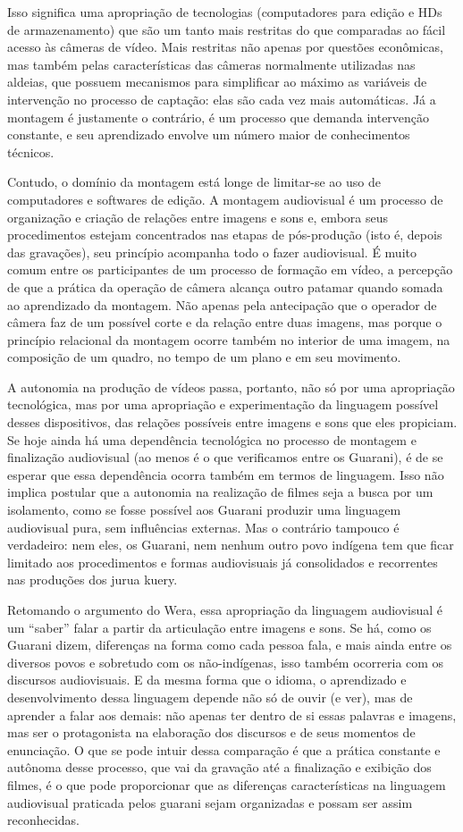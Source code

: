 Isso significa uma apropriação de tecnologias (computadores para edição
e HDs de armazenamento) que são um tanto mais restritas do que
comparadas ao fácil acesso às câmeras de vídeo. Mais restritas não
apenas por questões econômicas, mas também pelas características das
câmeras normalmente utilizadas nas aldeias, que possuem mecanismos para
simplificar ao máximo as variáveis de intervenção no processo de
captação: elas são cada vez mais automáticas. Já a montagem é
justamente o contrário, é um processo que demanda intervenção
constante, e seu aprendizado envolve um número maior de conhecimentos
técnicos.

Contudo, o domínio da montagem está longe de limitar-se ao uso de
computadores e softwares de edição. A montagem audiovisual é um
processo de organização e criação de relações entre imagens e sons e,
embora seus procedimentos estejam concentrados nas etapas de
pós-produção (isto é, depois das gravações), seu princípio acompanha
todo o fazer audiovisual. É muito comum entre os participantes de um
processo de formação em vídeo, a percepção de que a prática da operação
de câmera alcança outro patamar quando somada ao aprendizado da
montagem. Não apenas pela antecipação que o operador de câmera faz de
um possível corte e da relação entre duas imagens, mas porque o
princípio relacional da montagem ocorre também no interior de uma
imagem, na composição de um quadro, no tempo de um plano e em seu
movimento.

A autonomia na produção de vídeos passa, portanto, não só por uma
apropriação tecnológica, mas por uma apropriação e experimentação da
linguagem possível desses dispositivos, das relações possíveis entre
imagens e sons que eles propiciam. Se hoje ainda há uma dependência
tecnológica no processo de montagem e finalização audiovisual (ao menos
é o que verificamos entre os Guarani), é de se esperar que essa
dependência ocorra também em termos de linguagem. Isso não implica
postular que a autonomia na realização de filmes seja a busca por um
isolamento, como se fosse possível aos Guarani produzir uma linguagem
audiovisual pura, sem influências externas. Mas o contrário tampouco é
verdadeiro: nem eles, os Guarani, nem nenhum outro povo indígena tem
que ficar limitado aos procedimentos e formas audiovisuais já
consolidados e recorrentes nas produções dos jurua kuery.

Retomando o argumento do Wera, essa apropriação da linguagem audiovisual
é um ``saber'' falar a partir da articulação
entre imagens e sons. Se há, como os Guarani dizem, diferenças na forma
como cada pessoa fala, e mais ainda entre os diversos povos e sobretudo
com os não-indígenas, isso também ocorreria com os discursos
audiovisuais. E da mesma forma que o idioma, o aprendizado e
desenvolvimento dessa linguagem depende não só de ouvir (e ver), mas de
aprender a falar aos demais: não apenas ter dentro de si essas palavras
e imagens, mas ser o protagonista na elaboração dos discursos e de seus
momentos de enunciação. O que se pode intuir dessa comparação é que a
prática constante e autônoma desse processo, que vai da gravação até a
finalização e exibição dos filmes, é o que pode proporcionar que as
diferenças características na linguagem audiovisual praticada pelos
guarani sejam organizadas e possam ser assim reconhecidas. 

